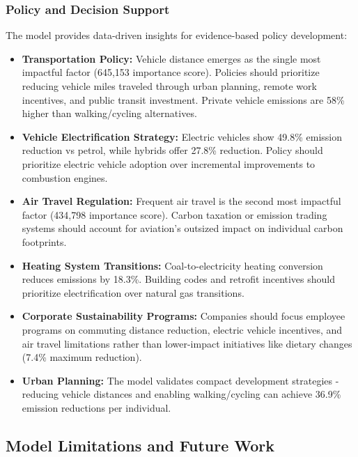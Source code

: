 \documentclass[12pt,a4paper]{article}
\begin{document}
\subsubsection{Policy and Decision Support}
The model provides data-driven insights for evidence-based policy development:

\begin{itemize}
    \item \textbf{Transportation Policy:} Vehicle distance emerges as the single most impactful factor (645,153 importance score). Policies should prioritize reducing vehicle miles traveled through urban planning, remote work incentives, and public transit investment. Private vehicle emissions are 58\% higher than walking/cycling alternatives.
    
    \item \textbf{Vehicle Electrification Strategy:} Electric vehicles show 49.8\% emission reduction vs petrol, while hybrids offer 27.8\% reduction. Policy should prioritize electric vehicle adoption over incremental improvements to combustion engines.
    
    \item \textbf{Air Travel Regulation:} Frequent air travel is the second most impactful factor (434,798 importance score). Carbon taxation or emission trading systems should account for aviation's outsized impact on individual carbon footprints.
    
    \item \textbf{Heating System Transitions:} Coal-to-electricity heating conversion reduces emissions by 18.3\%. Building codes and retrofit incentives should prioritize electrification over natural gas transitions.
    
    \item \textbf{Corporate Sustainability Programs:} Companies should focus employee programs on commuting distance reduction, electric vehicle incentives, and air travel limitations rather than lower-impact initiatives like dietary changes (7.4\% maximum reduction).
    
    \item \textbf{Urban Planning:} The model validates compact development strategies - reducing vehicle distances and enabling walking/cycling can achieve 36.9\% emission reductions per individual.
\end{itemize}

\subsection{Model Limitations and Future Work}
\end{document}
